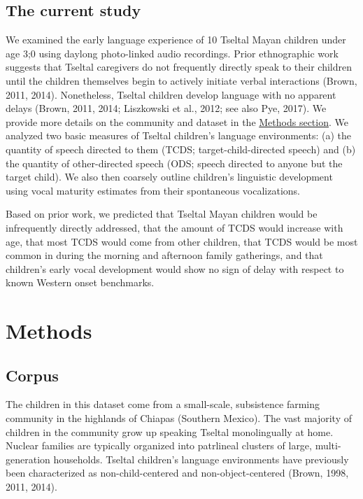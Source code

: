 \documentclass[floatsintext,man]{apa6}
\theoremstyle{definition}
\theoremstyle{definition}
\theoremstyle{definition}
\theoremstyle{remark}
\begin{document}
\subsection{The current study}\label{intro-currentstudy}

We examined the early language experience of 10 Tseltal Mayan children
under age 3;0 using daylong photo-linked audio recordings. Prior
ethnographic work suggests that Tseltal caregivers do not frequently
directly speak to their children until the children themselves begin to
actively initiate verbal interactions (Brown, 2011, 2014). Nonetheless,
Tseltal children develop language with no apparent delays (Brown, 2011,
2014; Liszkowski et al., 2012; see also Pye, 2017). We provide more
details on the community and dataset in the
\protect\hyperlink{methods}{Methods section}. We analyzed two basic
measures of Tseltal children's language environments: (a) the quantity
of speech directed to them (TCDS; target-child-directed speech) and (b)
the quantity of other-directed speech (ODS; speech directed to anyone
but the target child). We also then coarsely outline children's
linguistic development using vocal maturity estimates from their
spontaneous vocalizations.

Based on prior work, we predicted that Tseltal Mayan children would be
infrequently directly addressed, that the amount of TCDS would increase
with age, that most TCDS would come from other children, that TCDS would
be most common in during the morning and afternoon family gatherings,
and that children's early vocal development would show no sign of delay
with respect to known Western onset benchmarks.

\hypertarget{methods}{\section{Methods}\label{methods}}

\subsection{Corpus}\label{methods-dataset}

The children in this dataset come from a small-scale, subsistence
farming community in the highlands of Chiapas (Southern Mexico). The
vast majority of children in the community grow up speaking Tseltal
monolingually at home. Nuclear families are typically organized into
patrlineal clusters of large, multi-generation households. Tseltal
children's language environments have previously been characterized as
non-child-centered and non-object-centered (Brown, 1998, 2011, 2014).
\end{document}
